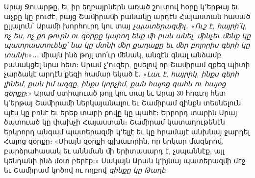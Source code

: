 \documentclass{article}
\begin{document}
{Արայ Ջուարթը, եւ իր եղբայրներն առած շուտով հօրը կ՚երթայ եւ աչքը կը բուժէ, բայց Շաﬕրաﬕ բանակը արդէն Հայաստան հասած ըլլալուն՝ Արաﬕ խորհուրդ կու տայ \emph{չպատերազﬕլ}․ «\emph{Ուշ է, հայրի՛կ, ոչ ես, ոչ քո թուրն ու զօրքը կարող ենք ﬕ բան անել, ﬕնչեւ ﬔնք կը պատրաստուենք՝ նա կը մտնի ﬔր քաղաքը եւ ﬔր բոլորիս գերի կը տանի}։»․․․ ﬕայն ինձ թոյլ տո՛ւր ﬔնակ, անզէն գնալ անձամբ բանակցել նրա հետ։ Արամ չ՚ուզեր, ըսելով որ Շաﬕրամ զքեզ պիտի չարձակէ արդէն քեզի համար եկած է․ «\emph{Լաւ է, հայրիկ, ինքս գերի լինեմ, քան իմ ազգը, ինքս կորչիմ, քան հայոց գահն ու հայոց զօրքը}։» Արամ ստիպուած թոյլ կու տայ եւ Արայ 30 հոգւոյ հետ կ՚երթայ Շաﬕրաﬕ ներկայանալու եւ Շաﬕրամ զինքն տեսնելուն պէս կը բռնէ եւ երեք տարի քովը կը պահէ։ Երրորդ տարին Արայ ծպտուած կը փախչի Հայաստան։ Շաﬕրամ կատաղութենէն երկրորդ անգամ պատերազﬕ կ՚ելլէ եւ կը հրամայէ անխնայ ջարդել Հայոց զօրքը։ «Միայն զօրքի գլխաւորին, որ երկար մազերով, բարձրահասակ եւ աննման ﬕ երիտասարդ է, չսպաննէք, այլ կենդանի ինձ մօտ բերէք։» Սակայն Արան կ՚իյնայ պատերազﬕ մէջ եւ Շաﬕրամ կոծով ու ողբով \emph{զինքը կը Թաղէ}։

}
\end{document}
